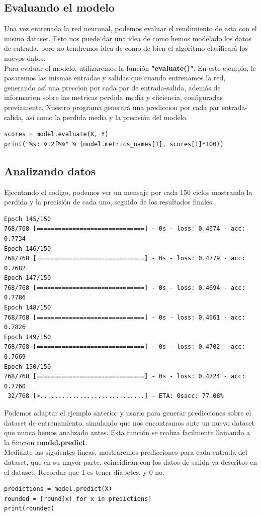 \subsection{Evaluando el modelo}
Una vez entrenada la red neuronal, podemos evaluar el rendimiento de esta con el mismo dataset. Esto nos puede dar una idea de como hemos modelado los datos de entrada, pero no tendremos idea de como de bien el algoritmo clasificará los nuevos datos.\\
Para evaluar el modelo, utilizaremos la función \textbf{"evaluate()"}. En este ejemplo, le pasaremos las mismas entradas y salidas que cuando entrenamos la red, generando así una preccion por cada par de entrada-salida, además de informacion sobre las metricas perdida media y eficiencia, configuradas previamente. Nuestro programa generará una prediccion por cada par entrada-salida, así como la perdida media y la precisión del modelo.
\begin{verbatim}
scores = model.evaluate(X, Y)
print("%s: %.2f%%" % (model.metrics_names[1], scores[1]*100))
\end{verbatim}

\subsection{Analizando datos}
Ejecutando el codigo, podemos ver un mensaje por cada 150 ciclos mostrando la perdida y la precisión de cada uno, seguido de los resultados finales.
\begin{verbatim}
Epoch 145/150
768/768 [==============================] - 0s - loss: 0.4674 - acc: 0.7734     
Epoch 146/150
768/768 [==============================] - 0s - loss: 0.4779 - acc: 0.7682     
Epoch 147/150
768/768 [==============================] - 0s - loss: 0.4694 - acc: 0.7786     
Epoch 148/150
768/768 [==============================] - 0s - loss: 0.4661 - acc: 0.7826     
Epoch 149/150
768/768 [==============================] - 0s - loss: 0.4702 - acc: 0.7669     
Epoch 150/150
768/768 [==============================] - 0s - loss: 0.4724 - acc: 0.7760     
 32/768 [>.............................] - ETA: 0sacc: 77.08%
 \end{verbatim}
Podemos adaptar el ejemplo anterior y usarlo para generar predicciones sobre el dataset de entrenamiento, simulando que nos encontramos ante un nuevo dataset que nunca hemos analizado antes. Esta función se realiza facilmente llamando a la funcion \textbf{model.predict}.\\
Mediante las siguientes lineas, mostraremos predicciones para cada entrada del dataset, que en su mayor parte, coincidirán con los datos de salida ya descritos en el dataset. Recordar que 1 es tener diabetes, y 0 no.
 \begin{verbatim}
predictions = model.predict(X)
rounded = [round(x) for x in predictions]
print(rounded)
\end{verbatim}


